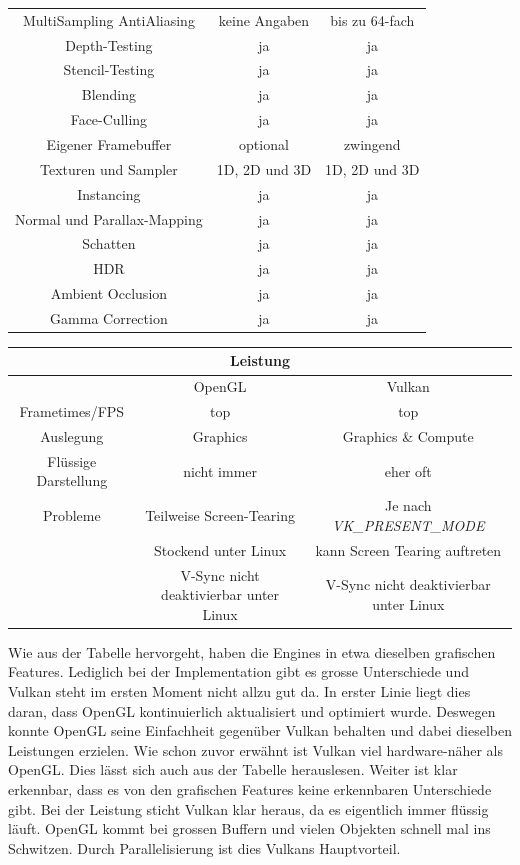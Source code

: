 \documentclass[titlepage, 11pt, a4paper, ngerman]{article}
\begin{document}
\begin{table}[ht]
\begin{tabular}{|c||c|c|}
        \hline
        MultiSampling AntiAliasing & keine Angaben & bis zu 64-fach \\
        Depth-Testing & ja & ja \\
        Stencil-Testing & ja & ja \\
        Blending & ja & ja \\
        \gls{Face}-Culling & ja & ja \\
        Eigener Framebuffer & optional & zwingend \\
        Texturen und Sampler & 1D, 2D und 3D & 1D, 2D und 3D \\
        Instancing & ja & ja \\
        Normal und Parallax-Mapping & ja & ja \\
        Schatten & ja & ja \\
        HDR & ja & ja \\
        Ambient Occlusion & ja & ja \\
        Gamma Correction & ja & ja \\
        \hline
    \end{tabular}
    \label{tab:comparison}
\end{table}
\pagebreak
\begin{table}[ht]
    \begin{tabular}{|c||c|c|}
        \hline
        \multicolumn{3}{|c|}{Leistung} \\
        \hline
        \hline
         & \acrshort{OpenGL} & Vulkan \\
        \hline
        \glspl{Frametime}/\acrshort{FPS} & top & top \\
        Auslegung & Graphics & Graphics \& Compute \\
        Flüssige Darstellung & nicht immer & eher oft \\
        Probleme & Teilweise Screen-Tearing & Je nach \textit{VK\_PRESENT\_MODE} \\
         & Stockend unter \gls{Linux} & kann Screen Tearing auftreten \\
         & V-Sync nicht deaktivierbar unter \gls{Linux} & V-Sync nicht deaktivierbar unter \gls{Linux} \\
        \hline
    \end{tabular}
\end{table}
\bigbreak
Wie aus der Tabelle hervorgeht, haben die \glspl{Engine} in etwa dieselben grafischen Features. Lediglich bei der Implementation gibt es grosse Unterschiede und Vulkan steht im ersten Moment nicht allzu gut da. In erster Linie liegt dies daran, dass \acrshort{OpenGL} kontinuierlich aktualisiert und optimiert wurde. Deswegen konnte \acrshort{OpenGL} seine Einfachheit gegenüber Vulkan behalten und dabei dieselben Leistungen erzielen. Wie schon zuvor erwähnt ist Vulkan viel hardware-näher als \acrshort{OpenGL}. Dies lässt sich auch aus der Tabelle herauslesen. Weiter ist klar erkennbar, dass es von den grafischen Features keine erkennbaren Unterschiede gibt. Bei der Leistung sticht Vulkan klar heraus, da es eigentlich immer flüssig läuft. \acrshort{OpenGL} kommt bei grossen Buffern und vielen Objekten schnell mal ins Schwitzen. Durch Parallelisierung ist dies Vulkans Hauptvorteil.\par
\end{document}
